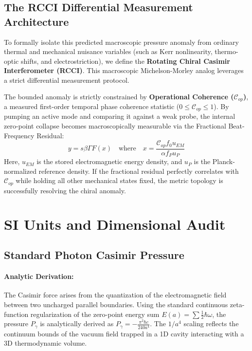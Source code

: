 \subsection{The RCCI Differential Measurement Architecture}\label{sec:rcci}

To formally isolate this predicted macroscopic pressure anomaly from ordinary thermal and mechanical nuisance variables (such as Kerr nonlinearity, thermo-optic shifts, and electrostriction), we define the \textbf{Rotating Chiral Casimir Interferometer (RCCI)}. This macroscopic Michelson-Morley analog leverages a strict differential measurement protocol.

The bounded anomaly is strictly constrained by \textbf{Operational Coherence ($\mathcal{C}_{op}$)}, a measured first-order temporal phase coherence statistic ($0 \le \mathcal{C}_{op} \le 1$). By pumping an active mode and comparing it against a weak probe, the internal zero-point collapse becomes macroscopically measurable via the Fractional Beat-Frequency Residual:
\begin{equation}
    y = s \beta \Gamma F(x) \quad \text{where} \quad x = \frac{\mathcal{C}_{op} f_0 u_{EM}}{\alpha f_P u_P}
\end{equation}
Here, $u_{EM}$ is the stored electromagnetic energy density, and $u_P$ is the Planck-normalized reference density. If the fractional residual perfectly correlates with $\mathcal{C}_{op}$ while holding all other mechanical states fixed, the metric topology is successfully resolving the chiral anomaly.

\section{SI Units and Dimensional Audit}\label{sec:units}

\subsection{Standard Photon Casimir Pressure}\label{sec:photon}
\paragraph{Analytic Derivation:} The Casimir force arises from the quantization of the electromagnetic field between two uncharged parallel boundaries. Using the standard continuous zeta-function regularization of the zero-point energy sum $E(a) = \sum \frac{1}{2}\hbar \omega$, the pressure $P_\gamma$ is analytically derived as $P_\gamma = -\frac{\pi^2 \hbar c}{240 a^4}$. The $1/a^4$ scaling reflects the continuum bounds of the vacuum field trapped in a 1D cavity interacting with a 3D thermodynamic volume.

